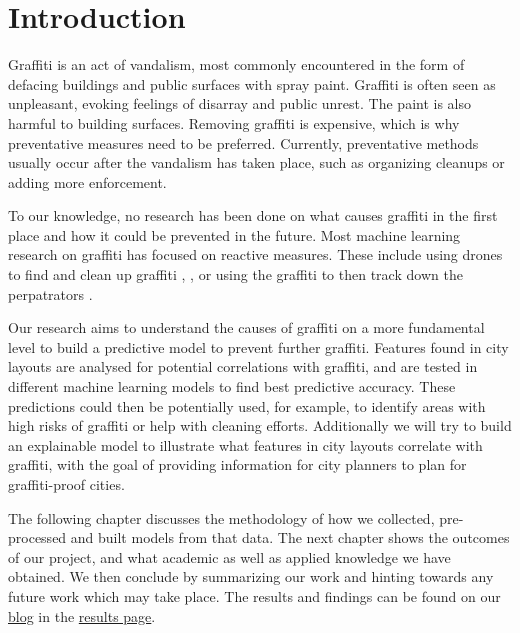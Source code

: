 \chapter{Introduction}


Graffiti is an act of vandalism, most commonly encountered in the form of defacing buildings and public surfaces with spray paint. Graffiti is often seen as unpleasant, evoking feelings of disarray and public unrest. The paint is also harmful to building surfaces. Removing graffiti is expensive, which is why preventative measures need to be preferred. Currently, preventative methods usually occur after the vandalism has taken place, such as organizing cleanups or adding more enforcement.

To our knowledge, no research has been done on what causes graffiti in the first place and how it could be prevented in the future. Most machine learning research on graffiti has focused on reactive measures. These include using drones to find and clean up graffiti \cite{uav}, \cite{drone}, or using the graffiti to then track down the perpatrators \cite{gang}.

Our research aims to understand the causes of graffiti on a more fundamental level to build a predictive model to prevent further graffiti. Features found in city layouts are analysed for potential correlations with graffiti, and are tested in different machine learning models to find best predictive accuracy. These predictions could then be potentially used, for example, to identify areas with high risks of graffiti or help with cleaning efforts. Additionally we will try to build an explainable model to illustrate what features in city layouts correlate with graffiti, with the goal of providing information for city planners to plan for graffiti-proof cities.

The following chapter discusses the methodology of how we collected, pre-processed and built models from that data. The next chapter shows the outcomes of our project, and what academic as well as applied knowledge we have obtained. We then conclude by summarizing our work and hinting towards any future work which may take place. The results and findings can be found on our \href{https://cowkeyman.github.io/PredictingGraffitiUsingCityLayouts/}{blog} in the \href{https://cowkeyman.github.io/PredictingGraffitiUsingCityLayouts/results.html}{results page}.

